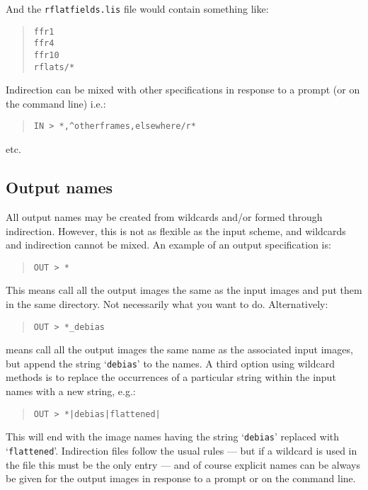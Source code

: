 \documentclass[twoside,11pt]{article}
\renewcommand{\_}{\texttt{\symbol{95}}}
\newenvironment{myquote}{\begin{quote}\begin{small}}{\end{small}\end{quote}}
\newcommand{\text}[1]{{\small \tt #1}}
\begin{document}
And the \text{rflatfields.lis} file would contain something like:
\begin{myquote}
\begin{verbatim}
ffr1
ffr4
ffr10
rflats/*
\end{verbatim}
\end{myquote}

Indirection can be mixed with other specifications in response to a
prompt (or on the command line) i.e.:
\begin{myquote}
\begin{verbatim}
IN > *,^otherframes,elsewhere/r*
\end{verbatim}
\end{myquote}
etc.

\subsection{Output names}

All output names may be created from wildcards and/or formed through
indirection. However, this is not as flexible as the input scheme,
and wildcards and indirection cannot be mixed. An example of an
output specification is:
\begin{myquote}
\begin{verbatim}
OUT > *
\end{verbatim}
\end{myquote}
This means call all the output images the same as the input images and put
them in the same directory.
Not necessarily what you want to do.
Alternatively:
\begin{myquote}
\begin{verbatim}
OUT > *_debias
\end{verbatim}
\end{myquote}
means call all the output images the same name as the associated
input images, but append the string `\text{\_debias}' to the names. A
third option using wildcard methods is to replace the occurrences of a
particular string within the input names with a new string, e.g.:
\begin{myquote}
\begin{verbatim}
OUT > *|debias|flattened|
\end{verbatim}
\end{myquote}
This will end with the image names having the string `\text{debias}'
replaced with `\text{flattened}'. Indirection files follow the usual
rules --- but if a wildcard is used in the file this must be the only
entry --- and of course explicit names can be always be given for the
output images in response to a prompt or on the command line.
\end{document}
